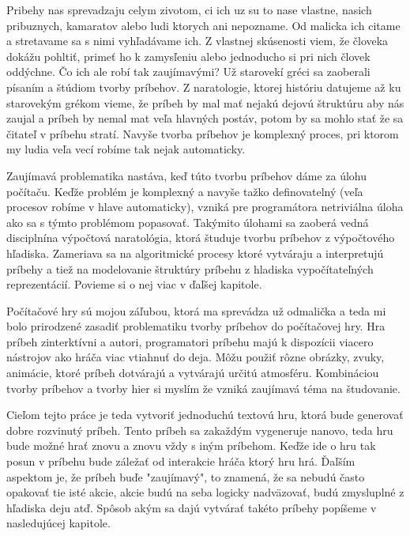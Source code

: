 Pribehy nas sprevadzaju celym zivotom, ci ich uz su to nase vlastne, nasich pribuznych, kamaratov alebo ludi ktorych ani nepozname. Od malicka ich citame a stretavame sa s nimi vyhľadávame ich. Z vlastnej skúsenosti viem, že človeka dokážu pohltiť, primeť ho k zamysľeniu alebo jednoducho si pri nich človek oddýchne. Čo ich ale robí tak zaujímavými? Už starovekí gréci sa zaoberali písaním a štúdiom tvorby príbehov. Z naratologie, ktorej históriu datujeme až ku starovekým grékom vieme, že príbeh by mal mať nejakú dejovú štruktúru aby nás zaujal a príbeh by nemal mat veľa hlavných postáv, potom by sa mohlo stať že sa čitateľ v príbehu stratí. Navyše tvorba príbehov je komplexný proces, pri ktorom my ludia veľa vecí robíme tak nejak automaticky.\par
Zaujímavá problematika nastáva, keď túto tvorbu príbehov dáme za úlohu počítaču. Keďže problém je komplexný a navyše tažko definovatelný (veľa procesov robíme v hlave automaticky), vzniká pre programátora netriviálna úloha ako sa s týmto problémom popasovať. Takýmito úlohami sa zaoberá vedná disciplnína výpočtová naratológia, ktorá študuje tvorbu príbehov z výpočtového hľadiska. Zameriava sa na algoritmické procesy ktoré vytváraju a interpretujú príbehy a tiež na modelovanie štruktúry príbehu z hladiska vypočítateľných reprezentácií. Povieme si o nej viac v ďaľšej kapitole.\par
Počítačové hry sú mojou záľubou, ktorá ma sprevádza už odmalička a teda mi bolo prirodzené zasadiť problematiku tvorby príbehov do počítačovej hry. Hra príbeh zinterktívni a autori, programatori príbehu majú k dispozícii viacero nástrojov ako hráča viac vtiahnuť do deja. Môžu použiť rôzne obrázky, zvuky, animácie, ktoré príbeh dotvárajú a vytvárajú určitú atmosféru. Kombináciou tvorby príbehov a tvorby hier si myslím že vzniká zaujímavá téma na študovanie.\par
Cieľom tejto práce je teda vytvoriť jednoduchú textovú hru, ktorá bude generovať dobre rozvinutý príbeh. Tento príbeh sa zakaždým vygeneruje nanovo, teda hru bude možné hrať znovu a znovu vždy s iným príbehom. Keďže ide o hru tak posun v príbehu bude záležať od interakcie hráča ktorý hru hrá. Ďaľším aspektom je, že príbeh buďe "zaujímavý", to znamená, že sa nebudú často opakovať tie isté akcie, akcie budú na seba logicky nadväzovať, budú zmysluplné z hľadiska deju atď. Spôsob akým sa dajú vytvárať takéto príbehy popíšeme v nasledujúcej kapitole.



